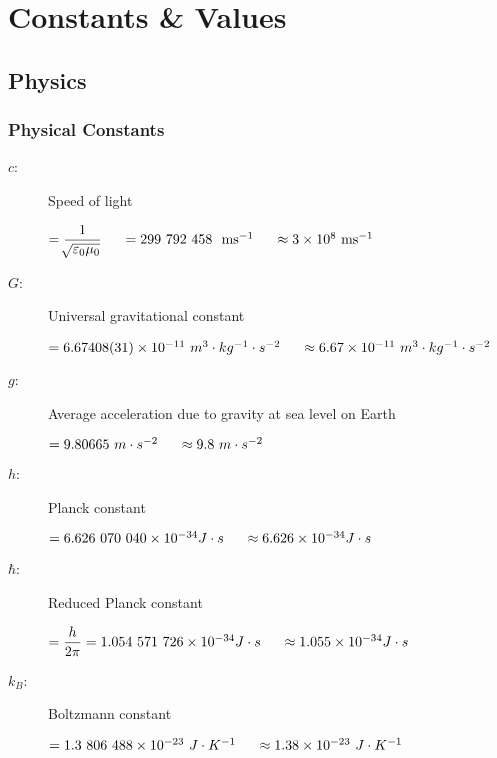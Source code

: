 \chapter{Constants \& Values}

\section{Physics}


\subsection{Physical Constants}	
\begin{description}

\item[$c$:] Speed of light
\begin{itemize}
\items $ = \dfrac{1}{\sqrt[]{\varepsilon_0 \mu_0}} \tab[0.5cm] = 299\ 792\ 458\ \ \si{\metre\second^{-1}} \tab[0.5cm]\approx 3 \times 10^{8}\ \si{\metre\second^{-1}}$
\end{itemize}			

\item[$G$:] Universal gravitational constant
\begin{itemize}
\items $ = 6.67408(31) \times 10^{-11} \ m^3\cdot kg^{-1}\cdot s^{-2} \tab[0.5cm]\approx 6.67 \times 10^{-11} \ m^3\cdot kg^{-1}\cdot s^{-2}$
\end{itemize}			

\item[$g$:] Average acceleration due to gravity at sea level on Earth
\begin{itemize}
\items $ = 9.80665 \ m \cdot s^{-2} \tab[0.5cm]\approx 9.8 \ m \cdot s^{-2}$
\end{itemize}			

\item[$h$:] Planck constant
\begin{itemize}
\items $ = 6.626\ 070\ 040\times 10^{-34} J\cdot s \tab[0.5cm]\approx 6.626\times 10^{-34} J\cdot s  $
\end{itemize}			

\item[$\hbar$:] Reduced Planck constant
\begin{itemize}
\items $ = \dfrac{h}{2\pi} = 1.054\ 571\ 726\times 10^{-34} J\cdot s \tab[0.5cm]\approx 1.055\times 10^{-34} J\cdot s  $
\end{itemize}			

\item[$k_B$:] Boltzmann constant
\begin{itemize}
\items $ = 1.3\ 806\ 488\times 10^{-23} \ J\cdot K^{-1} \tab[0.5cm] \approx 1.38\times 10^{-23}\ J\cdot K^{-1}$
\end{itemize}			


\end{description}

